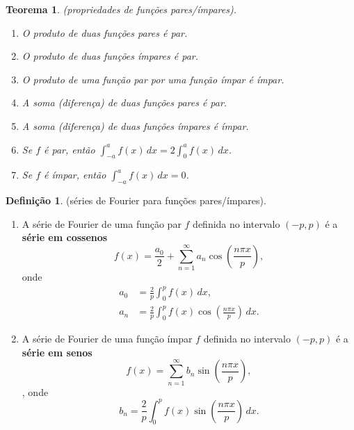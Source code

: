 \documentclass{article}
\theoremstyle{plain}
\newtheorem{thm}{Teorema}[section]
\theoremstyle{definition}
\newtheorem{defn}{Definição}[section]
\theoremstyle{remark}
\begin{document}
\begin{thm} (propriedades de funções pares/ímpares).
    \begin{enumerate}
        \item[\textup{(a)}] O produto de duas funções pares é par.
        \item[\textup{(b)}] O produto de duas funções ímpares é par.
        \item[\textup{(c)}] O produto de uma função par por uma função ímpar é ímpar.
        \item[\textup{(d)}] A soma (diferença) de duas funções pares é par.
        \item[\textup{(e)}] A soma (diferença) de duas funções ímpares é ímpar.
        \item[\textup{(f)}] Se \(f\) é par, então \(\int_{-a}^{a} f(x) \, dx = 2\int_{0}^{a} f(x) \, dx\).
        \item[\textup{(g)}] Se \(f\) é ímpar, então \(\int_{-a}^{a} f(x) \, dx = 0\).
    \end{enumerate}
\end{thm}

\begin{defn} (séries de Fourier para funções pares/ímpares).
    \begin{enumerate}
        \item[(i)] A série de Fourier de uma função par \(f\) definida no intervalo \((-p,p)\) é a \textbf{série em cossenos}
        \begin{equation} \label{eq:fourier-cos}
            f(x) = \frac{a_0}{2} + \sum_{n=1}^{\infty} a_n \cos\left(\frac{n\pi x}{p}\right),
        \end{equation}
        \noindent onde 
        \begin{align}
            a_0 &= \frac{2}{p} \int_{0}^{p} f(x) \, dx, \\
            a_n &= \frac{2}{p} \int_{0}^{p} f(x) \cos\left(\frac{n\pi x}{p}\right) \, dx.
        \end{align}
        \item[(ii)] A série de Fourier de uma função ímpar \(f\) definida no intervalo \((-p,p)\) é a \textbf{série em senos}
        \begin{equation} \label{eq:fourier-sin}
            f(x) = \sum_{n=1}^{\infty} b_n \sin\left(\frac{n\pi x}{p}\right),
        \end{equation},
        \noindent onde
        \begin{equation}
            b_n = \frac{2}{p} \int_{0}^{p} f(x) \sin\left(\frac{n\pi x}{p}\right) \, dx.
        \end{equation}
    \end{enumerate}
\end{defn}
\end{document}
